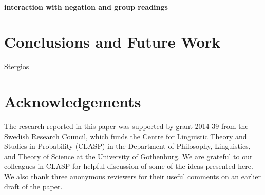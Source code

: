 \documentclass[a4paper,11pt]{article}
\begin{document}
\paragraph{interaction with negation and group readings}
\section{Conclusions and Future Work}
Stergios
\section*{Acknowledgements}

The research reported in this paper was supported by grant 2014-39 from the
Swedish Research Council, which funds the Centre for Linguistic Theory and
Studies in Probability (CLASP) in the Department of Philosophy, Linguistics,
and Theory of Science at the University of Gothenburg. We are grateful to
our colleagues in CLASP for helpful discussion of some of the ideas presented
here. We also thank three anonymous reviewers for their useful comments on an
earlier draft of the paper.


\end{document}
